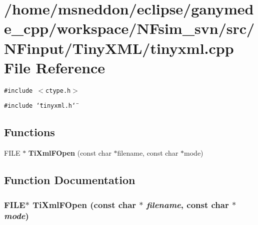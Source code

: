 \section{/home/msneddon/eclipse/ganymede\_\-cpp/workspace/NFsim\_\-svn/src/NFinput/TinyXML/tinyxml.cpp File Reference}
\label{tinyxml_8cpp}


{\tt \#include $<$ctype.h$>$}\par
{\tt \#include \char`\"{}tinyxml.h\char`\"{}}\par
\subsection*{Functions}
\begin{CompactItemize}
\item 
FILE $\ast$ {\bf TiXmlFOpen} (const char $\ast$filename, const char $\ast$mode)
\end{CompactItemize}


\subsection{Function Documentation}
\subsubsection{\setlength{\rightskip}{0pt plus 5cm}FILE$\ast$ TiXmlFOpen (const char $\ast$ {\em filename}, const char $\ast$ {\em mode})}\label{tinyxml_8cpp_72fac93bfb73cb50c2bfb3f9c8520557}


